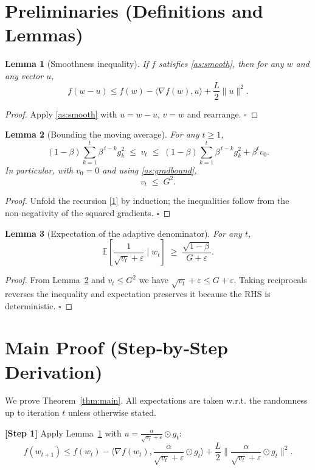 \documentclass{article}
\newtheorem{lemma}{Lemma}
\begin{document}
\newpage
\section*{Preliminaries (Definitions and Lemmas)}
\begin{lemma}[Smoothness inequality]\label{lem:smooth}
If $f$ satisfies \ref{as:smooth}, then for any $w$ and any vector $u$,
\[
f(w-u)\le f(w)-\langle\nabla f(w),u\rangle+\frac{L}{2}\|u\|^{2}.
\tag{L1}
\]
\end{lemma}
\begin{proof}
Apply \ref{as:smooth} with $u=w-u$, $v=w$ and rearrange. \hfill $\square$
\end{proof}
\begin{lemma}[Bounding the moving average]\label{lem:vtbound}
For any $t\ge1$,
\[
(1-\beta)\sum_{k=1}^{t}\beta^{\,t-k}g_{k}^{2}
\;\le\;
v_{t}
\;\le\;
(1-\beta)\sum_{k=1}^{t}\beta^{\,t-k}g_{k}^{2}+ \beta^{t}v_{0}.
\tag{L2}
\]
In particular, with $v_{0}=0$ and using \ref{as:gradbound},
\[
v_{t}\;\le\; G^{2}.
\tag{L3}
\]
\end{lemma}
\begin{proof}
Unfold the recursion \eqref{1} by induction; the inequalities follow from the non‑negativity of the squared gradients. \hfill $\square$
\end{proof}
\begin{lemma}[Expectation of the adaptive denominator]\label{lem:denom}
For any $t$,
\[
\mathbb{E}\!\left[\frac{1}{\sqrt{v_{t}}+\varepsilon}\mid w_{t}\right]
\;\ge\;
\frac{\sqrt{1-\beta}}{G+\varepsilon}.
\tag{L4}
\]
\end{lemma}
\begin{proof}
From Lemma~\ref{lem:vtbound} and $v_{t}\le G^{2}$ we have $\sqrt{v_{t}}+\varepsilon\le G+\varepsilon$. Taking reciprocals reverses the inequality and expectation preserves it because the RHS is deterministic. \hfill $\square$
\end{proof}

\section*{Main Proof (Step‑by‑Step Derivation)}
We prove Theorem~\ref{thm:main}. All expectations are taken w.r.t. the randomness up to iteration $t$ unless otherwise stated.

\bigskip
\noindent\textbf{[Step 1]} Apply Lemma~\ref{lem:smooth} with $u = \frac{\alpha}{\sqrt{v_{t}}+\varepsilon}\odot g_{t}$:
\[
f(w_{t+1})
\le f(w_{t})
-\Big\langle\nabla f(w_{t}),\frac{\alpha}{\sqrt{v_{t}}+\varepsilon}\odot g_{t}\Big\rangle
+\frac{L}{2}\Big\|\frac{\alpha}{\sqrt{v_{t}}+\varepsilon}\odot g_{t}\Big\|^{2}.
\tag{4}
\]
\end{document}
